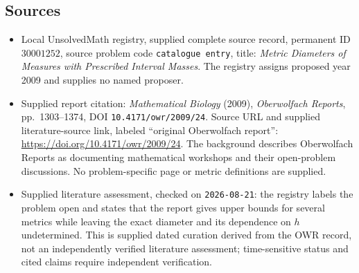 \documentclass[11pt]{article}
\begin{document}
\subsection{Sources}
\begin{itemize}
\item Local UnsolvedMath registry, supplied complete source record, permanent ID \(30001252\), source problem code \texttt{catalogue entry}, title: \emph{Metric Diameters of Measures with Prescribed Interval Masses}. The registry assigns proposed year 2009 and supplies no named proposer.
\item Supplied report citation: \emph{Mathematical Biology} (2009), \emph{Oberwolfach Reports}, pp.\ 1303--1374, DOI \texttt{10.4171/owr/2009/24}. Source URL and supplied literature-source link, labeled ``original Oberwolfach report'': \url{https://doi.org/10.4171/owr/2009/24}. The background describes Oberwolfach Reports as documenting mathematical workshops and their open-problem discussions. No problem-specific page or metric definitions are supplied.
\item Supplied literature assessment, checked on \texttt{2026-08-21}: the registry labels the problem open and states that the report gives upper bounds for several metrics while leaving the exact diameter and its dependence on \(h\) undetermined. This is supplied dated curation derived from the OWR record, not an independently verified literature assessment; time-sensitive status and cited claims require independent verification.
\end{itemize}
\end{document}
